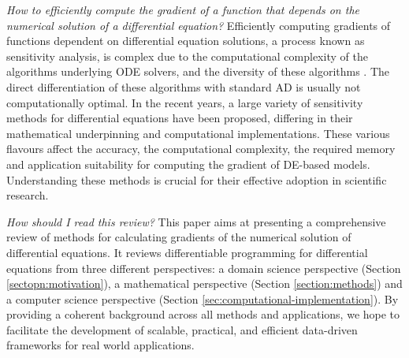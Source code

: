 \textit{How to efficiently compute the gradient of a function that depends on the numerical solution of a differential equation?}
Efficiently computing gradients of functions dependent on differential equation solutions, a process known as sensitivity analysis, is complex due to the computational complexity of the algorithms underlying ODE solvers, and the diversity of these algorithms \cite{hairer-solving-1, hairer-solving-2}. 
The direct differentiation of these algorithms with standard AD is usually not computationally optimal.
In the recent years, a large variety of sensitivity methods for differential equations have been proposed, differing in their mathematical underpinning and computational implementations. 
These various flavours affect the accuracy, the computational complexity, the required memory and application suitability for computing the gradient of DE-based models. 
Understanding these methods is crucial for their effective adoption in scientific research. 

\textit{How should I read this review?}
This paper aims at presenting a comprehensive review of methods for calculating gradients of the numerical solution of differential equations. 
It reviews differentiable programming for differential equations from three different perspectives: a domain science perspective (Section \ref{sectopn:motivation}), a mathematical perspective (Section \ref{section:methods}) and a computer science perspective (Section \ref{sec:computational-implementation}). 
By providing a coherent background across all methods and applications, we hope to facilitate the development of scalable, practical, and efficient data-driven frameworks for real world applications.

